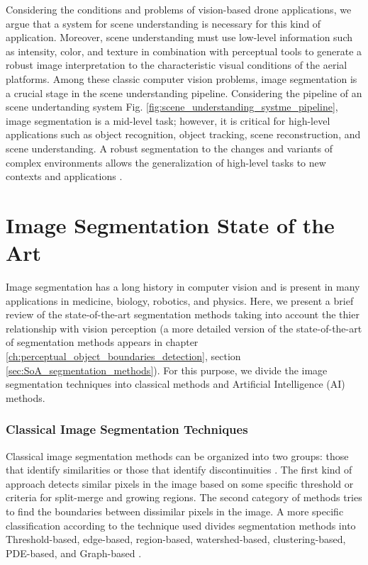 Considering the conditions and problems of vision-based drone applications, we argue that a system for scene understanding is necessary for this kind of application. Moreover, scene understanding must use low-level information such as intensity, color, and texture in combination with perceptual tools to generate a robust image interpretation to the characteristic visual conditions of the aerial platforms. Among these classic computer vision problems, image segmentation is a crucial stage in the scene understanding pipeline. Considering the pipeline of an scene undertanding system Fig. \ref{fig:scene_understanding_systme_pipeline}, image segmentation is a mid-level task; however, it is critical for high-level applications such as object recognition, object tracking, scene reconstruction, and scene understanding. A robust segmentation to the changes and variants of complex environments allows the generalization of high-level tasks to new contexts and applications \citep{Maninis.Pont-Tuset.ea:PAMI:2018}.

\section*{Image Segmentation State of the Art}

Image segmentation has a long history in computer vision and is present in many applications in medicine, biology, robotics, and physics. Here, we present a brief review of the state-of-the-art segmentation methods taking into account the thier relationship with vision perception (a more detailed version of the state-of-the-art of segmentation methods appears in chapter \ref{ch:perceptual_object_boundaries_detection}, section \ref{sec:SoA_segmentation_methods}). For this purpose, we divide the image segmentation techniques into classical methods and Artificial Intelligence (AI) methods. 

\subsubsection*{Classical Image Segmentation Techniques} 
Classical image segmentation methods can be organized into two groups: those that identify similarities or those that identify discontinuities \citep{Zaitoun.Aqel:ICCMIT:2015}. The first kind of approach detects similar pixels in the image based on some specific threshold or criteria for split-merge and growing regions. The second category of methods tries to find the boundaries between dissimilar pixels in the image. A more specific classification according to the technique used divides segmentation methods into Threshold-based, edge-based, region-based, watershed-based, clustering-based, PDE-based, and Graph-based \citep{Zaitoun.Aqel:ICCMIT:2015}.

